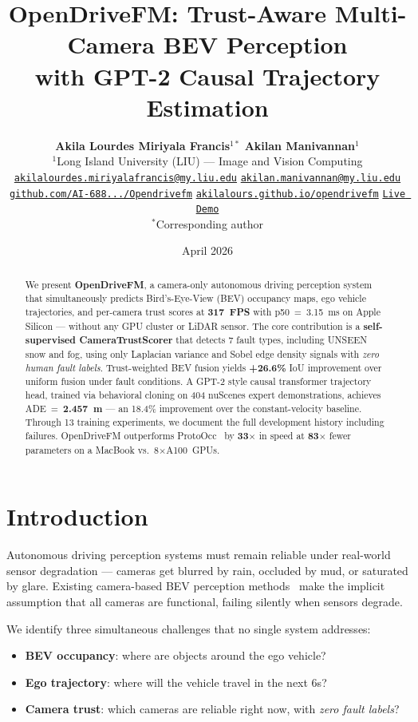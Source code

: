 \documentclass[10pt,twocolumn]{article}
\title{%
  \vspace{-0.5em}%
  {\Large\bfseries\color{myblue}
    OpenDriveFM: Trust-Aware Multi-Camera BEV Perception\\
    with GPT-2 Causal Trajectory Estimation%
  }%
  \vspace{0.2em}
}
\author{%
  \textbf{Akila Lourdes Miriyala Francis}$^{1*}$
  \quad
  \textbf{Akilan Manivannan}$^{1}$
  \\[4pt]
  $^{1}$Long Island University (LIU) --- Image and Vision Computing
  \\[2pt]
  \small
  \href{mailto:akilalourdes.miriyalafrancis@my.liu.edu}
       {\texttt{akilalourdes.miriyalafrancis@my.liu.edu}}
  \quad
  \href{mailto:akilan.manivannan@my.liu.edu}
       {\texttt{akilan.manivannan@my.liu.edu}}
  \\[2pt]
  \small
  \faGithub\;
  \href{https://github.com/AI-688-Image-and-Vision-Computing/Opendrivefm}
       {\texttt{github.com/AI-688.../Opendrivefm}}
  \quad
  \faGlobe\;
  \href{https://akilalours.github.io/opendrivefm}
       {\texttt{akilalours.github.io/opendrivefm}}
  \quad
  \faPlay\;
  \href{https://9acbd6a2ebf0d9764c.gradio.live}
       {\texttt{Live Demo}}
  \\[2pt]
  \small $^{*}$Corresponding author
}
\date{April 2026}
\newcommand{\best}[1]{\textbf{\color{mygreen}#1}}
\begin{document}
\maketitle

\begin{abstract}
We present \textbf{OpenDriveFM}, a camera-only autonomous driving
perception system that simultaneously predicts Bird's-Eye-View (BEV)
occupancy maps, ego vehicle trajectories, and per-camera trust
scores at \best{317~FPS} with p50~=~3.15~ms on Apple Silicon ---
without any GPU cluster or LiDAR sensor.
The core contribution is a \textbf{self-supervised CameraTrustScorer}
that detects 7 fault types, including UNSEEN snow and fog, using only
Laplacian variance and Sobel edge density signals with
\textit{zero human fault labels}.
Trust-weighted BEV fusion yields \best{+26.6\%} IoU improvement over
uniform fusion under fault conditions.
A GPT-2 style causal transformer trajectory head, trained via
behavioral cloning on 404 nuScenes expert demonstrations, achieves
ADE~=~\best{2.457~m} --- an 18.4\% improvement over the
constant-velocity baseline.
Through 13 training experiments, we document the full development
history including failures.
OpenDriveFM outperforms ProtoOcc~\cite{kim2025protoocc} by
\textbf{33$\times$} in speed at \textbf{83$\times$} fewer parameters
on a MacBook vs.\ 8$\times$A100~GPUs.
\end{abstract}

\section{Introduction}
\label{sec:intro}

Autonomous driving perception systems must remain reliable under
real-world sensor degradation --- cameras get blurred by rain,
occluded by mud, or saturated by glare. Existing camera-based BEV
perception methods~\cite{chambon2024pointbev,philion2020lss} make
the implicit assumption that all cameras are functional, failing
silently when sensors degrade.

We identify three simultaneous challenges that no single system
addresses:
\begin{itemize}[leftmargin=*,topsep=2pt,itemsep=1pt]
  \item \textbf{BEV occupancy}: where are objects around the ego vehicle?
  \item \textbf{Ego trajectory}: where will the vehicle travel in the next 6s?
  \item \textbf{Camera trust}: which cameras are reliable right now,
        with \textit{zero fault labels}?
\end{itemize}
\end{document}
